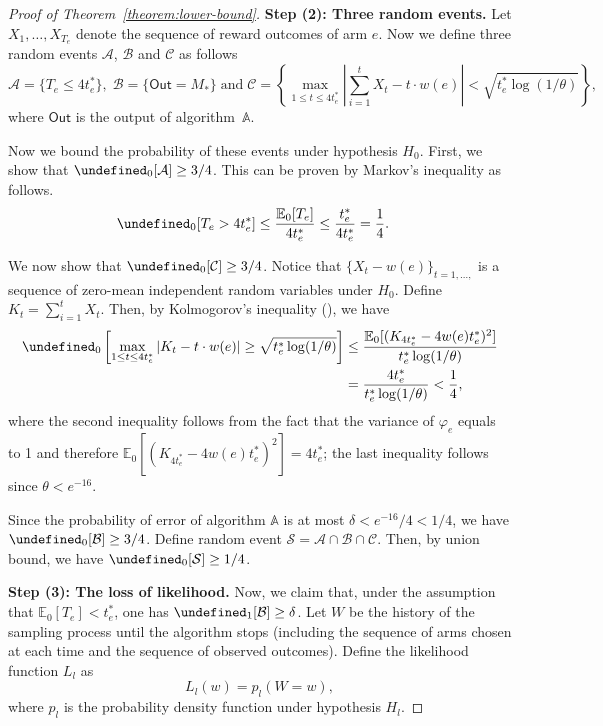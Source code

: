 \documentclass{article}
\newcommand{\Rew}{\varphi}
\newcommand{\E}{\mathbb E}
\newcommand{\out}{\mathsf{Out}}
\let\Pr\undefined
\DeclareMathOperator{\Pr}{Pr}
\begin{document}
\begin{proof}[Proof of Theorem~\ref{theorem:lower-bound}]
\textbf{Step (2): Three random events.}
Let $X_1,\ldots,X_{T_e}$ denote the sequence of reward outcomes of arm $e$.
Now we define three random events $\mathcal A$, $\mathcal B$ and $\mathcal C$ as follows
$$
\mathcal A = \{T_e \le 4t_e^* \},\;\mathcal B=\{\out=M_*\}\;\text{and}\;\mathcal C=\left\{\max_{1\le t \le 4t_e^*} \left|\sum_{i=1}^t X_t - t\cdot w(e)\right|  < \sqrt{t_e^*\log(1/\theta)} \right\},
$$
where $\out$ is the output of algorithm~$\mathbb A$.

Now we bound the probability of these events under hypothesis $H_0$.
First, we show that $\Pr_0[\mathcal A] \ge 3/4$. 
This can be proven by Markov's inequality as follows.
\begin{align*}
\Pr_0[T_e > 4t_e^*] &\le \frac{\E_0[T_e]}{4t_e^*} \le \frac{t_e^*}{4t_e^*} = \frac14.
\end{align*}

We now show that $\Pr_0[\mathcal C] \ge 3/4$.
Notice that $\big\{X_t-w(e)\big\}_{t=1,\ldots,}$ is a sequence of zero-mean independent random variables under $H_0$.
Define $K_t = \sum_{i=1}^t X_t$.
Then, by Kolmogorov's inequality (), we have
\begin{align*}
\Pr_0\left[\max_{1\le t \le 4t_e^*} \left|K_t-t\cdot w(e)\right| \ge \sqrt{t_e^*\log(1/\theta)} \right]
&\le \frac{\E_0[ (K_{4t_e^*}-4w(e)t_e^*)^2]}{t_e^*\log(1/\theta)}\\
&= \frac{4t_e^*}{t_e^*\log(1/\theta)} < \frac14,
\end{align*}
where the second inequality follows from the fact that the variance of $\Rew_e$ equals to 1 and therefore $\E_0[(K_{4t_e^*}-4w(e)t_e^*)^2] = 4t_e^*$; the last inequality follows 
since $\theta < e^{-16}$.

Since the probability of error of algorithm $\mathbb A$ is at most $\delta <  e^{-16}/4 < 1/4$, we have $\Pr_0[\mathcal B] \ge 3/4$.
Define random event $\mathcal S=\mathcal A\cap \mathcal B \cap \mathcal C$. 
Then, by union bound, we have $\Pr_0[\mathcal S]\ge 1/4$.

\textbf{Step (3): The loss of likelihood.}
Now, we claim that, under the assumption that $\E_0[T_e] < t_e^*$, one has $\Pr_1[\mathcal B] \ge \delta$.
Let $W$ be the history of the sampling process until the algorithm stops (including the sequence of arms chosen at each time and the sequence of observed outcomes).
Define the likelihood function $L_l$ as 
$$
L_l(w) = p_l(W=w),
$$
where $p_l$ is the probability density function under hypothesis $H_l$.


\end{proof}
\end{document}
